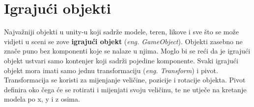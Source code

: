 \section{Igrajući objekti}
Najvažniji objekti u unity-u koji sadrže modele, teren, likove i sve što se može vidjeti u sceni se zove \textbf{igrajući objekt} (\emph{eng. GameObject}). Objekti zasebno ne znače puno bez komponenti koje se nalaze u njima. Moglo bi se reći da je igrajući objekt ustvari samo kontenjer koji sadrži pojedine komponente. Svaki igrajući objekt mora imati samo jednu transformaciju (\emph{eng. Transform}) i pivot. Transformacija se koristi za mijenjanje veličine, pozicije i rotacije objekta. Pivot definira oko čega će se rotirati i mijenjati svoju veličinu, te ne utječe na kretanje modela po x, y i z osima.